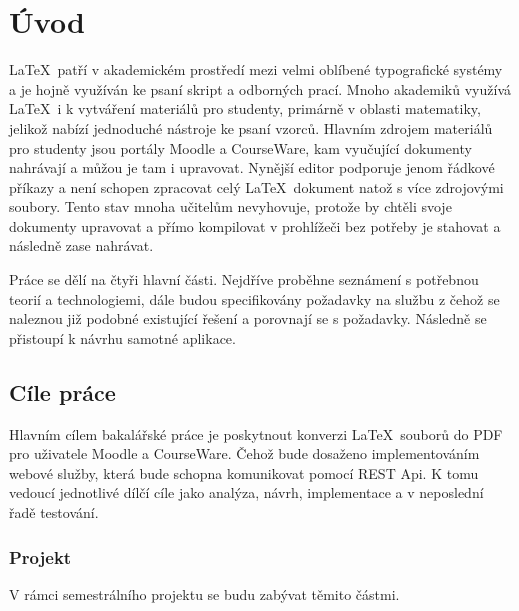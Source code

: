 \chapter{Úvod}
\LaTeX\ patří v akademickém prostředí mezi velmi oblíbené typografické systémy a je hojně využíván ke psaní skript a odborných prací. Mnoho akademiků využívá \LaTeX\ i k vytváření materiálů pro studenty, primárně v oblasti matematiky, jelikož nabízí jednoduché nástroje ke psaní vzorců. Hlavním zdrojem materiálů pro studenty jsou portály Moodle a CourseWare, kam vyučující dokumenty nahrávají a můžou je tam i upravovat. Nynější editor podporuje jenom řádkové příkazy a není schopen zpracovat celý \LaTeX\ dokument natož s více zdrojovými soubory. Tento stav mnoha učitelům nevyhovuje, protože by chtěli svoje dokumenty upravovat a přímo kompilovat v prohlížeči bez potřeby je stahovat a následně zase nahrávat. 

Práce se dělí na čtyři hlavní části. Nejdříve proběhne seznámení s potřebnou teorií a technologiemi, dále budou specifikovány požadavky na službu z čehož se naleznou již podobné existující řešení a porovnají se s požadavky. Následně se přistoupí k návrhu samotné aplikace.


\section{Cíle práce}
Hlavním cílem bakalářské práce je poskytnout konverzi \LaTeX\ souborů do PDF pro uživatele Moodle a CourseWare. Čehož bude dosaženo implementováním webové služby, která bude schopna komunikovat pomocí REST Api. K tomu vedoucí jednotlivé dílčí cíle jako analýza, návrh, implementace a v neposlední řadě testování.

\subsection{Projekt}
V rámci semestrálního projektu se budu zabývat těmito částmi. 